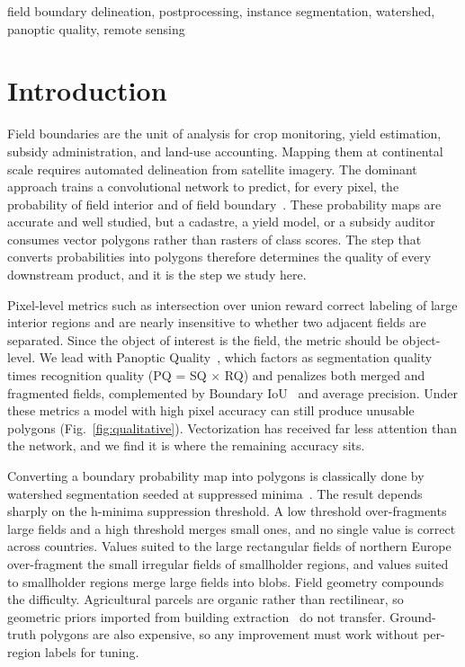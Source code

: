 \documentclass[conference]{IEEEtran}
\begin{document}
\begin{IEEEkeywords}
field boundary delineation, postprocessing, instance segmentation, watershed, panoptic quality, remote sensing
\end{IEEEkeywords}

\section{Introduction}
Field boundaries are the unit of analysis for crop monitoring, yield estimation, subsidy administration, and land-use accounting. Mapping them at continental scale requires automated delineation from satellite imagery. The dominant approach trains a convolutional network to predict, for every pixel, the probability of field interior and of field boundary~\cite{kerner2024ftw,waldner2020decode}. These probability maps are accurate and well studied, but a cadastre, a yield model, or a subsidy auditor consumes vector polygons rather than rasters of class scores. The step that converts probabilities into polygons therefore determines the quality of every downstream product, and it is the step we study here.

Pixel-level metrics such as intersection over union reward correct labeling of large interior regions and are nearly insensitive to whether two adjacent fields are separated. Since the object of interest is the field, the metric should be object-level. We lead with Panoptic Quality~\cite{kirillov2019panoptic}, which factors as segmentation quality times recognition quality (PQ = SQ $\times$ RQ) and penalizes both merged and fragmented fields, complemented by Boundary IoU~\cite{cheng2021boundaryiou} and average precision. Under these metrics a model with high pixel accuracy can still produce unusable polygons (Fig.~\ref{fig:qualitative}). Vectorization has received far less attention than the network, and we find it is where the remaining accuracy sits.

Converting a boundary probability map into polygons is classically done by watershed segmentation seeded at suppressed minima~\cite{soille2004morphological,koyuncu2016iterative,waldner2020decode}. The result depends sharply on the h-minima suppression threshold. A low threshold over-fragments large fields and a high threshold merges small ones, and no single value is correct across countries. Values suited to the large rectangular fields of northern Europe over-fragment the small irregular fields of smallholder regions, and values suited to smallholder regions merge large fields into blobs. Field geometry compounds the difficulty. Agricultural parcels are organic rather than rectilinear, so geometric priors imported from building extraction~\cite{zorzi2022polyworld,girard2021framefield,zorzi2020regularization} do not transfer. Ground-truth polygons are also expensive, so any improvement must work without per-region labels for tuning.
\end{document}
